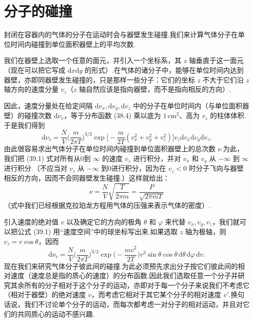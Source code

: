 \section{分子的碰撞}

封闭在容器内的气体的分子在运动时会与器壁发生碰撞.我们来计算气体分子在单位时间内碰撞到单位面积器壁上的平均次数.

我们在器壁上选取一个任意的面元，并引入一个坐标系，其 $z$ 轴垂直于这一面元（现在可以把它写成 $\mathrm{d}x\mathrm{d}y$ 的形式）.在气体的诸分子中，能够在单位时间内达到器壁，亦即同器壁发生碰撞的，只是那样一些分子：它们的坐标 $z$ 不大于它们沿 $z$ 轴方向的速度分量 $v_z$（$z$ 轴自然应该是指向器壁，而不是指向相反的方向）.

因此，速度分量处在给定间隔 $\mathrm{d}v_x,\mathrm{d}v_y,\mathrm{d}v_z$ 中的分子在单位时间内（与单位面积器壁）的碰撞次数 $\mathrm{d}\nu_v$，等于分布函数 (38.4) 乘以底为 $1\,\mathrm{cm}^2$、高为 $v_z$ 的柱体体积.于是我们得到
\begin{equation}
  \mathrm{d}\nu_v=\frac{N}{V}\Big(\frac{m}{2\pi T}\Big)^{3/2}
  \exp\Bigg[-\frac{m}{2T}\left(v_x^2+v_y^2+v_z^2\right)\Bigg]
  v_z\mathrm{d}v_x\mathrm{d}v_y\mathrm{d}v_z.
\end{equation}
由此很容易求出气体分子在单位时间内碰撞到单位面积器壁上的总次数 $\nu$.为此，我们把 (39.1) 式对所有从0到 $\infty$ 的速度 $v_z$ 进行积分，并对 $v_x$ 和 $v_y$ 从 $-\infty$ 到 $\infty$ 进行积分.（不应当对 $v_z$ 从 $-\infty$ 到0进行积分，因为在 $v_z<0$ 时分子飞向与器壁相反的方向，因而不会同器壁发生碰撞.）这样就给出：
\begin{equation}
  \nu=\frac{N}{V}\sqrt{\frac{T}{2\pi m}}=\frac{P}{\sqrt{2\pi mT}}
\end{equation}
（式中我们已经根据克拉珀龙方程用气体的压强来表示气体的密度）.

引入速度的绝对值 $v$ 以及确定它的方向的极角 $\theta$ 和 $\varphi$ 来代替 $v_x,v_y,v_z$，我们就可以把公式 (39.1) 用“速度空间”中的球坐标写出来.如果选取 $z$ 轴为极轴，则 $v_z=v\cos\theta$，因而
\begin{equation}
  \mathrm{d}\nu_v=\frac{N}{V}\Big(\frac{m}{2\pi T}\Big)^{3/2}
  \exp\Big(-\frac{mv^2}{2T}\Big)v^3\sin\theta\cos\theta\,
  \mathrm{d}\theta\,\mathrm{d}\varphi\,\mathrm{d}v.
\end{equation}
现在我们来研究气体分子彼此间的碰撞.为此必须预先求出分子按它们彼此间的相对速度（速度总是指的质心的速度）的分布函数.因此我们选取任意一个分子并研究其余所有的分子相对于这个分子的运动，亦即对于每一个分子来说我们不考虑它（相对于器壁）的绝对速度 $v$，而考虑它相对于其它某个分子的相对速度 $v'$.换句话说，我们不讨论单个分子的运动，而每次都考虑一对分子的相对运动，并且对它们的共同质心的运动不感兴趣.

